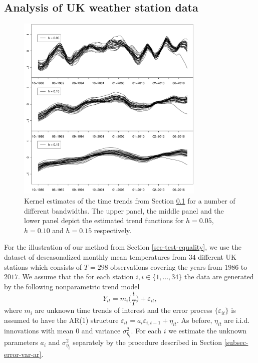 \subsection{Analysis of UK weather station data}\label{subsec-data-2} 
\begin{figure}[t]
\centering
\includegraphics[width=0.8\textwidth]{Plots/stations_data.pdf}
\vspace{0.2cm}

\caption{Kernel estimates of the time trends from Section \ref{subsec-data-2} for a number of different bandwidths. The upper panel, the middle panel and the lower panel depict the estimated trend functions for $h = 0.05$, $h = 0.10$ and $h = 0.15$ respectively.}\label{plot-results-app2}
\end{figure}

For the illustration of our method from Section \ref{sec-test-equality}, we use the dataset of deseasonalized monthly mean temperatures from 34 different UK stations which consists of $T=298$ observations covering the years from $1986$ to $2017$. We assume that the for each station $i, i \in \{1,\ldots, 34\}$ the data are generated by the following nonparametric trend model 
\[ Y_{it} = m_i\Big(\frac{t}{T}\Big) + \varepsilon_{it}, \]
where $m_i$ are unknown time trends of interest and the error process $\{ \varepsilon_{it} \}$ is assumed to have the AR(1) structure $\varepsilon_{it} = a_i \varepsilon_{i,t-1} + \eta_{it}$. As before, $\eta_{it}$ are i.i.d. innovations with mean $0$ and variance $\sigma_{\eta_i}^2$. For each $i$ we estimate the unknown parameters $a_i$ and $\sigma_{\eta_i}^2$ separately by the procedure described in Section \ref{subsec-error-var-ar}.


